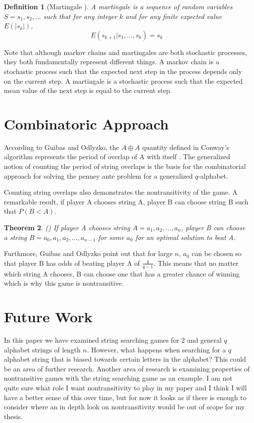 \documentclass{article}
\newtheorem{theorem}{Theorem}[section]
\newtheorem{definition}[theorem]{Definition}
\numberwithin{mytheorem}{subsection} %
\begin{document}
		\begin{definition}[Martingale \cite{li}]
			A martingale is a sequence of random variables $S = s_1, s_2, ...$ such that for any integer $k$ and for any finite expected value $E(|s_k|)$,
			$$E(s_{k+1} | s_1, ..., s_k) = s_k$$		
		\end{definition}

		Note that although markov chains and martingales are both stochastic processes, they both fundamentally represent different things. A markov chain is a stochastic process such that the expected next step in the process depends only on the current step. A martingale is a stochastic process such that the expected mean value of the next step is equal to the current step. 

	\section{Combinatoric Approach}
		According to Guibas and Odlyzko, the $A \oplus A$ quantity defined in Conway's algorithm represents the period of overlap of A with itself \cite{guibas}. The generalized notion of counting the period of string overlaps is the basis for the combinatorial approach for solving the penney ante problem for a generalized $q$-alphabet. 

		Counting string overlaps also demonstrates the nontransitivity of the game. A remarkable result, if player A chooses string A, player B can choose string B such that $P(B < A)$.
		\begin{theorem}(\cite{guibas})
			If player A chooses string $A = a_1,a_2,...,a_n$, player B can choose a string $B = a_0,a_1,a_2,...,a_{n-1}$ for some $a_0$ for an optimal solution to beat A.
		\end{theorem}

		Furthmore, Guibas and Odlyzko point out that for large $n$, $a_0$ can be chosen so that player B has odds of beating player A of $\frac{q}{q-1}$. This means that no matter which string A chooses, B can choose one that has a greater chance of winning which is why this game is nontransitive. 


	\section{Future Work}
		In this paper we have examined string searching games for 2 and general $q$ alphabet strings of length $n$. However, what happens when searching for a $q$ alphabet string that is biased towards certain letters in the alphabet? This could be an area of further research. Another area of research is examining properties of nontransitive games with the string searching game as an example. I am not quite sure what role I want nontransitivity to play in my paper and I think I will have a better sense of this over time, but for now it looks as if there is enough to consider where an in depth look on nontransitivity would be out of scope for my thesis.
\end{document}
